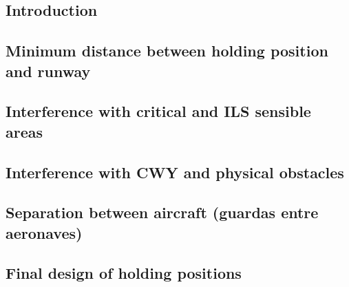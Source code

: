 		\subsection{Introduction}
		\subsection{Minimum distance between holding position and runway}
		\subsection{Interference with critical and ILS sensible areas}
		\subsection{Interference with CWY and physical obstacles}
		\subsection{Separation between aircraft (guardas entre aeronaves)}
		\subsection{Final design of holding positions}